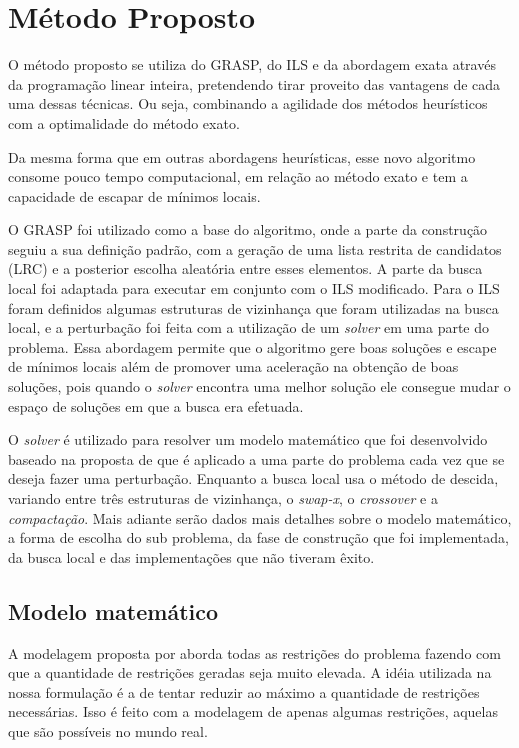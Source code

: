 \chapter{Método Proposto} \label{cap:metodoprop}
  
O método proposto se utiliza do GRASP, do ILS e da abordagem exata através da
programação linear inteira, pretendendo tirar proveito das vantagens de cada
uma dessas técnicas. Ou seja, combinando a agilidade dos métodos heurísticos com
a optimalidade do método exato.
  
Da mesma forma que em outras abordagens heurísticas, esse novo algoritmo
consome pouco tempo computacional, em relação ao método exato e tem a capacidade
de escapar de mínimos locais.
  
O GRASP foi utilizado como a base do algoritmo, onde a parte da construção
seguiu a sua definição padrão, com a geração de uma lista restrita de candidatos
(LRC) e a posterior escolha aleatória entre esses elementos. A parte da busca
local foi adaptada para executar em conjunto com o ILS modificado. Para o ILS
foram definidos algumas estruturas de vizinhança que foram utilizadas
na busca local, e a perturbação foi feita com a utilização de um \textit{solver}
em uma parte do problema. Essa abordagem permite que o algoritmo gere boas
soluções e escape de mínimos locais além de promover uma aceleração na obtenção
de boas soluções, pois quando o \textit{solver} encontra uma melhor solução ele
consegue mudar o espaço de soluções em que a busca era efetuada.


O \textit{solver} é utilizado para resolver um modelo matemático que foi
desenvolvido baseado na proposta de \cite{pontes2002} que é aplicado a uma parte do problema cada
vez que se deseja fazer uma perturbação. Enquanto a busca local usa o método de
descida, variando entre três estruturas de vizinhança, o \textit{swap-x}, o
\textit{crossover} e a \textit{compactação}. Mais adiante serão dados mais
detalhes sobre o modelo matemático, a forma de escolha do sub problema, da fase
de construção que foi implementada, da busca local e das implementações que não
tiveram êxito.

\section{Modelo matemático} \label{sec:modelomat}

   
A modelagem proposta por \cite{pontes2002} aborda todas as restrições do
problema fazendo com que a quantidade de restrições geradas seja muito elevada.
A idéia utilizada na nossa formulação é a de tentar reduzir ao máximo a
quantidade de restrições necessárias. Isso é feito com a modelagem de apenas
algumas restrições, aquelas que são possíveis no mundo real.


